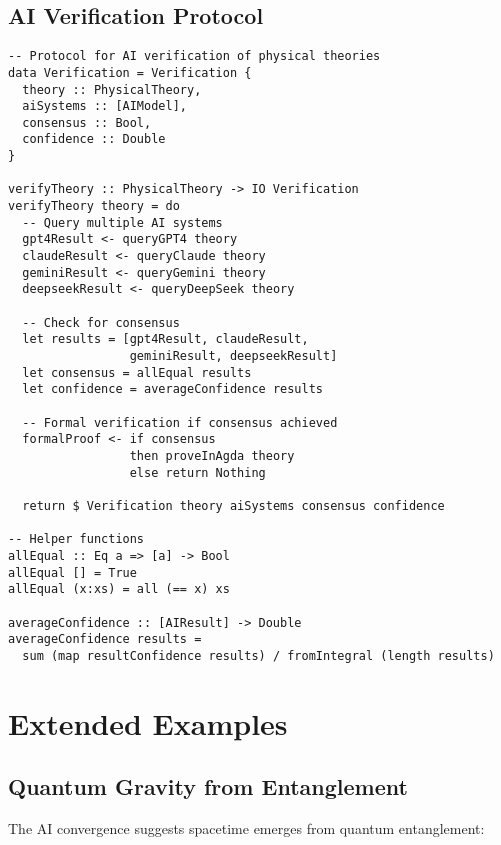 \documentclass[11pt,a4paper]{article}
\begin{document}
\subsection{AI Verification Protocol}

\begin{lstlisting}
-- Protocol for AI verification of physical theories
data Verification = Verification {
  theory :: PhysicalTheory,
  aiSystems :: [AIModel],
  consensus :: Bool,
  confidence :: Double
}

verifyTheory :: PhysicalTheory -> IO Verification
verifyTheory theory = do
  -- Query multiple AI systems
  gpt4Result <- queryGPT4 theory
  claudeResult <- queryClaude theory
  geminiResult <- queryGemini theory
  deepseekResult <- queryDeepSeek theory
  
  -- Check for consensus
  let results = [gpt4Result, claudeResult, 
                 geminiResult, deepseekResult]
  let consensus = allEqual results
  let confidence = averageConfidence results
  
  -- Formal verification if consensus achieved
  formalProof <- if consensus 
                 then proveInAgda theory
                 else return Nothing
                 
  return $ Verification theory aiSystems consensus confidence

-- Helper functions
allEqual :: Eq a => [a] -> Bool
allEqual [] = True
allEqual (x:xs) = all (== x) xs

averageConfidence :: [AIResult] -> Double
averageConfidence results = 
  sum (map resultConfidence results) / fromIntegral (length results)
\end{lstlisting}

\section{Extended Examples}

\subsection{Quantum Gravity from Entanglement}

The AI convergence suggests spacetime emerges from quantum entanglement:
\end{document}
